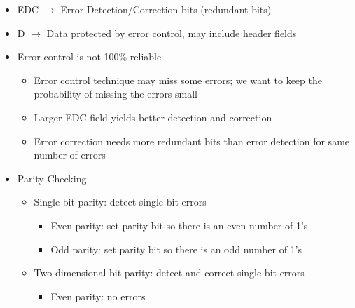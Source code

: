 \begin{itemize}
\begin{itemize}
      \item EDC $\to$ Error Detection/Correction bits (redundant bits)

      \item D $\to$ Data protected by error control, may include header fields

      \item Error control is not 100\% reliable

        \begin{itemize}

          \item Error control technique may miss some errors; we want to keep the probability of missing the errors small

          \item Larger EDC field yields better detection and correction

          \item Error correction needs more redundant bits than error detection for same number of errors

        \end{itemize}

      \item Parity Checking

        \begin{itemize}

          \item Single bit parity: detect single bit errors

            \begin{itemize}

              \item Even parity: set parity bit so there is an even number of 1's

              \item Odd parity: set parity bit so there is an odd number of 1's

            \end{itemize}

          \item Two-dimensional bit parity: detect and correct single bit errors

            \begin{itemize}

              \item Even parity: no errors

            \end{itemize}

        \end{itemize}


\end{itemize}
\end{itemize}
